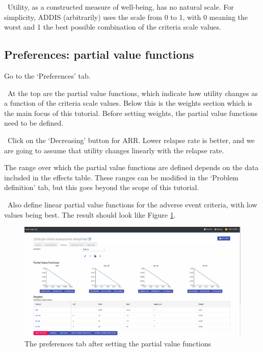 \documentclass[00_mcda_tutorial.tex]{subfiles}
\begin{document}
\noindent \faGraduationCap \, Utility, as a constructed measure of well-being, has no natural scale. For simplicity, ADDIS (arbitrarily) uses the scale from 0 to 1, with 0 meaning the worst and 1 the best possible combination of the criteria scale values.

\subsection*{Preferences: partial value functions}
\leftpointright Go to the ‘Preferences’ tab.
\newline

\noindent \faGraduationCap \, At the top are the partial value functions, which indicate how utility changes as a function of the criteria scale values. Below this is the weights section which is the main focus of this tutorial. Before setting weights, the partial value functions need to be defined.
\newline

\noindent \leftpointright \, Click on the ‘Decreasing’ button for ARR. Lower relapse rate is better, and we are going to assume that utility changes linearly with the relapse rate.

\noindent The range over which the partial value functions are defined depends on the data included in the effects table. These ranges can be modified in the ‘Problem definition’ tab, but this goes beyond the scope of this tutorial.
\newline

\noindent \leftpointright \, Also define linear partial value functions for the adverse event criteria, with low values being best. The result should look like Figure \ref{fig:preferences}.
\newline

\begin{figure}[!h]
    \centering
	\includegraphics[width=\textwidth]{fig/preferences.png}
    \caption{The preferences tab after setting the partial value functions}
	\label{fig:preferences}
\end{figure}
\end{document}
